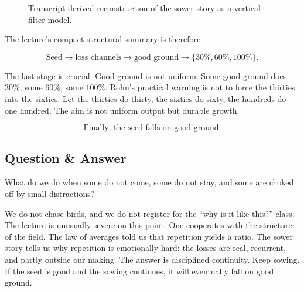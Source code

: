 \begin{figure}[h]
\centering
{}
\caption{Transcript-derived reconstruction of the sower story as a vertical filter model.}
\end{figure}

The lecture's compact structural summary is therefore

\begin{equation}
\text{Seed} \longrightarrow \text{loss channels} \longrightarrow \text{good ground} \longrightarrow \{30\%,60\%,100\%\}.
\end{equation}

The last stage is crucial. Good ground is not uniform. Some good ground does \(30\%\), some \(60\%\), some \(100\%\). Rohn's practical warning is not to force the thirties into the sixties. Let the thirties do thirty, the sixties do sixty, the hundreds do one hundred. The aim is not uniform output but durable growth.

\begin{equation}
\text{Finally, the seed falls on good ground.}
\end{equation}

\subsection{Question \& Answer}

What do we do when some do not come, some do not stay, and some are choked off by small distractions?

We do not chase birds, and we do not register for the ``why is it like this?'' class. The lecture is unusually severe on this point. One cooperates with the structure of the field. The law of averages told us that repetition yields a ratio. The sower story tells us why repetition is emotionally hard: the losses are real, recurrent, and partly outside our making. The answer is disciplined continuity. Keep sowing. If the seed is good and the sowing continues, it will eventually fall on good ground.

